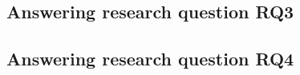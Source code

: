 
\subsection{Answering research question RQ3}
\label{sec:rqthree}



\subsection{Answering research question RQ4}
\label{sec:rqfour}




